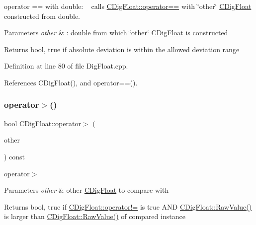 operator == with double\+: ~\newline
 calls \hyperlink{classCDigFloat_ad8980d984bf2bab71d15b830fd0180a5}{C\+Dig\+Float\+::operator==} with \char`\"{}other\char`\"{} \hyperlink{classCDigFloat}{C\+Dig\+Float} constructed from double. 


\begin{DoxyParams}{Parameters}
{\em other} & \+: double from which \char`\"{}other\char`\"{} \hyperlink{classCDigFloat}{C\+Dig\+Float} is constructed \\
\hline
\end{DoxyParams}
\begin{DoxyReturn}{Returns}
bool, true if absolute deviation is within the allowed deviation range 
\end{DoxyReturn}


Definition at line 80 of file Dig\+Float.\+cpp.



References C\+Dig\+Float(), and operator==().

\mbox{\label{classCDigFloat_a06b58ba24f51ddcb737c826f2191d4c9}} 
\subsubsection{\texorpdfstring{operator$>$()}{operator>()}}
{\footnotesize\ttfamily bool C\+Dig\+Float\+::operator$>$ (\begin{DoxyParamCaption}\item[{const \hyperlink{classCDigFloat}{C\+Dig\+Float} \&}]{other }\end{DoxyParamCaption}) const}



operator$>$ 


\begin{DoxyParams}{Parameters}
{\em other} & other \hyperlink{classCDigFloat}{C\+Dig\+Float} to compare with \\
\hline
\end{DoxyParams}
\begin{DoxyReturn}{Returns}
bool, true if \hyperlink{classCDigFloat_a15c13c035aff8184491bd9629403a33a}{C\+Dig\+Float\+::operator!=} is true A\+ND \hyperlink{classCDigFloat_ab6d3001a549d7496156321cbb26dde51}{C\+Dig\+Float\+::\+Raw\+Value()} is larger than \hyperlink{classCDigFloat_ab6d3001a549d7496156321cbb26dde51}{C\+Dig\+Float\+::\+Raw\+Value()} of compared instance 
\end{DoxyReturn}


